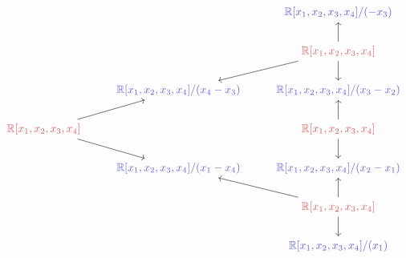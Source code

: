 \documentclass[12pt]{article}
\theoremstyle{definition}
\newcommand{\<}{\langle}
\renewcommand{\>}{\rangle}
\begin{document}
\newpage
\[\begin{tikzcd}
	&& \textcolor{rgb,255:red,92;green,92;blue,214}{\mathbb{R}[x_1,x_2,x_3,x_4] / (-x_3)} \\
	&& \textcolor{rgb,255:red,214;green,92;blue,92}{\mathbb{R}[x_1,x_2,x_3,x_4]} \\
	& \textcolor{rgb,255:red,92;green,92;blue,214}{\mathbb{R}[x_1,x_2,x_3,x_4] / (x_4 -x_3)} & \textcolor{rgb,255:red,92;green,92;blue,214}{\mathbb{R}[x_1,x_2,x_3,x_4]/(x_3-x_2)} \\
	\textcolor{rgb,255:red,214;green,92;blue,92}{\mathbb{R}[x_1,x_2,x_3,x_4]} && \textcolor{rgb,255:red,214;green,92;blue,92}{\mathbb{R}[x_1,x_2,x_3,x_4]} \\
	& \textcolor{rgb,255:red,92;green,92;blue,214}{\mathbb{R}[x_1,x_2,x_3,x_4] /(x_1 - x_4)} & \textcolor{rgb,255:red,92;green,92;blue,214}{\mathbb{R}[x_1,x_2,x_3,x_4] / (x_2 - x_1)} \\
	&& \textcolor{rgb,255:red,214;green,92;blue,92}{\mathbb{R}[x_1,x_2,x_3,x_4]} \\
	&& \textcolor{rgb,255:red,92;green,92;blue,214}{\mathbb{R}[x_1,x_2,x_3,x_4] / (x_1)}
	\arrow[from=2-3, to=1-3]
	\arrow[from=2-3, to=3-2]
	\arrow[from=2-3, to=3-3]
	\arrow[from=4-1, to=3-2]
	\arrow[from=4-1, to=5-2]
	\arrow[from=4-3, to=3-3]
	\arrow[from=4-3, to=5-3]
	\arrow[from=6-3, to=5-2]
	\arrow[from=6-3, to=5-3]
	\arrow[from=6-3, to=7-3]
\end{tikzcd}\]
\end{document}
